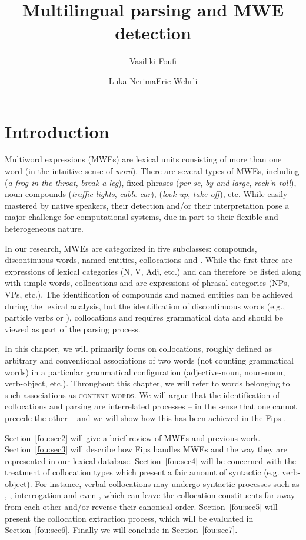 \documentclass[output=paper]{langsci/langscibook}
\title{Multilingual parsing and {M}{W}{E} detection}
\author{Vasiliki Foufi\affiliation{University of Geneva}\and Luka Nerima\affiliation{University of Geneva}\lastand Eric Wehrli\affiliation{University of Geneva}}
\begin{document}
\maketitle

\section{Introduction}

Multiword expressions (MWEs) are lexical units consisting of more than one word (in the intuitive sense of \textit{word}). There are several types of MWEs, including  (\textit{a frog in the throat}, \textit{break a leg}), fixed phrases (\textit{per se}, \textit{by and large}, \textit{rock'n roll}), noun compounds (\textit{traffic lights}, \textit{cable car}),  (\textit{look up}, \textit{take off}), etc. While easily mastered by native speakers, their detection and/or their interpretation pose a major challenge for computational systems, due in part to their flexible and heterogeneous nature. 

In our research, MWEs are categorized in five subclasses: compounds, discontinuous words, named entities, collocations and . While the first three are expressions of lexical categories (N, V, Adj, etc.) and can therefore be listed along with simple words, collocations and  are expressions of phrasal categories (NPs, VPs, etc.). The identification of compounds and named entities can be achieved during the lexical analysis, but the identification of discontinuous words (e.g., particle verbs or ), collocations and  requires grammatical data and should be viewed as part of the parsing process. 

In this chapter, we will primarily focus on collocations, roughly defined as arbitrary and conventional associations of two words (not counting grammatical words) in a particular grammatical configuration (adjective-noun, noun-noun, verb-object, etc.). Throughout this chapter, we will refer to words belonging to such associations as \textsc{content words}. We will
argue that the identification of collocations and parsing are interrelated processes -- in the sense that one cannot precede the other --  and we will show how this has been achieved in the Fips  \citep{wehrli07,wn15}.%

Section~\ref{fou:sec2} will give a brief review of MWEs and previous work. Section~\ref{fou:sec3} will describe how Fips handles MWEs and the way they are represented in our lexical database. Section~\ref{fou:sec4} will be concerned with the treatment of collocation types which present a fair amount of syntactic  (e.g. verb-object). For instance, verbal collocations may undergo syntactic processes such as , , interrogation and even , which can leave the collocation constituents far away from each other and/or reverse their canonical order. Section~\ref{fou:sec5} will present the collocation extraction process, which will be evaluated in Section~\ref{fou:sec6}. Finally we will conclude in Section~\ref{fou:sec7}.
\end{document}
